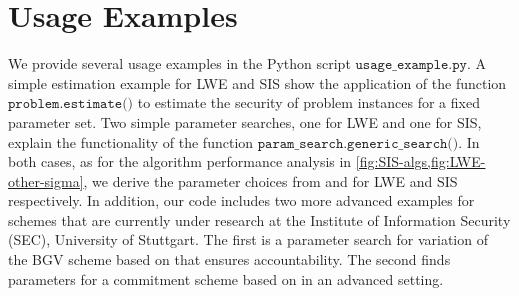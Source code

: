 \section{Usage Examples}\label{sec:tool-application}
We provide several usage examples in the Python script $\texttt{usage\_example.py}$. A simple estimation example for LWE and SIS show the application of the function $\texttt{problem.estimate()}$ to estimate the security of problem instances for a fixed parameter set. Two simple parameter searches, one for LWE and one for SIS, explain the functionality of the function $\texttt{param\_search.generic\_search()}$. In both cases, as for the algorithm performance analysis in \cref{fig:SIS-algs,fig:LWE-other-sigma}, we derive the parameter choices from \cite{Reg05} and \cite{MP12} for LWE and SIS respectively. %
In addition, our code includes two more advanced examples for schemes that are currently under research at the Institute of Information Security (SEC), University of Stuttgart. The first is a parameter search for variation of the BGV scheme based on \cite{BGV11,DPSZ12} that ensures accountability. The second finds parameters for a commitment scheme based on \cite{BDLOP18} in an advanced setting.
